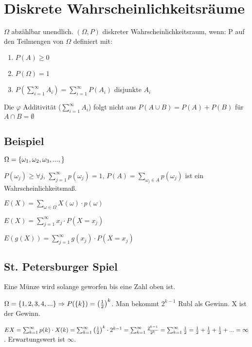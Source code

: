\renewcommand{\ldate}{2015-12-21}

\section{Diskrete Wahrscheinlichkeitsräume}

$\Omega$ abzählbar unendlich.  $(\Omega, P)$ diskreter Wahrscheinlichkeitsraum, wenn: P auf den Teilmengen von $\Omega$ definiert mit:

\begin{enumerate}
\item $P(A) \geq 0 $
\item $P(\Omega) = 1$
\item $P(\sum_{i=1}^{\infty} A_i) = \sum_{i=1}^{\infty} P(A_i)$ disjunkte $A_i$
\end{enumerate}

Die $\varphi$ Additivität ($\sum_{i=1}^{\infty} A_i$) folgt nicht aus $P(A\cup B) = P(A) + P(B)$ für $A\cap B = \emptyset$

\subsection{Beispiel}
$\Omega =  \left\lbrace \omega_1, \omega_2, \omega_3, ...,  \right\rbrace $

$P(\omega_j) \geq \forall j$, 
$\sum_{j=1}^{\infty} p(\omega_j) = 1$,
$P(A) = \sum_{\omega_j \in A} p(\omega_j)$ ist ein Wahrscheinlichkeitsmaß.

$E(X) = \sum_{\omega \in \Omega} X(\omega) \cdot p(\omega)$

$E(X) = \sum_{j=1}^{\infty} x_j \cdot P(X=x_j)$

$E(g(X)) = \sum_{j=1}^{\infty} g(x_j) \cdot P(X=x_j)$

\subsection{St. Petersburger Spiel}
Eine Münze wird solange geworfen bis eine Zahl oben ist. 

$\Omega =  \left\lbrace 1,2,3,4,... \right\rbrace  \Rightarrow P( \left\lbrace k \right\rbrace ) =  \left( \frac{1}{2} \right) ^k$.
Man bekommt $2^{k-1}$ Rubl als Gewinn. 
X ist der Gewinn.

$
EX = \sum_{k=1}^{\infty} p(k) \cdot X(k) 
= \sum_{k=1}^{\infty}  \left( \frac{1}{2} \right) ^k \cdot 2^{k-1}
= \sum_{k=1}^{\infty} \frac{2^{k-1}}{2^k}
= \sum_{k=1}^{\infty} \frac{1}{2} 
= \frac{1}{2} + \frac{1}{2} + \frac{1}{2} + ... = \infty
$.  
Erwartungswert ist $\infty$.

